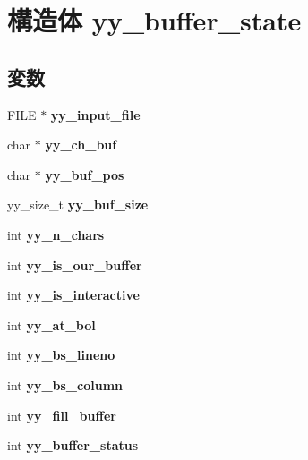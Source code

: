 \section{構造体 yy\_\-buffer\_\-state}
\label{structyy__buffer__state}
\subsection*{変数}
\begin{DoxyCompactItemize}
\item 
FILE $\ast$ {\bfseries yy\_\-input\_\-file}\label{structyy__buffer__state_afb2a40bf9a1b84be81d8e8c0bbcbee21}

\item 
char $\ast$ {\bfseries yy\_\-ch\_\-buf}\label{structyy__buffer__state_af61a9e79f8fc1edb3ae8a2fa2952ce22}

\item 
char $\ast$ {\bfseries yy\_\-buf\_\-pos}\label{structyy__buffer__state_ae8850ab3d90f9339c392020e7d83c4c7}

\item 
yy\_\-size\_\-t {\bfseries yy\_\-buf\_\-size}\label{structyy__buffer__state_a98a79041ff2a95eaa8a5c6d1e1562306}

\item 
int {\bfseries yy\_\-n\_\-chars}\label{structyy__buffer__state_aa86c122f2050dbfd365fcf547e6fc1c3}

\item 
int {\bfseries yy\_\-is\_\-our\_\-buffer}\label{structyy__buffer__state_a1e64bbdc1343d886bee3af97e19644bc}

\item 
int {\bfseries yy\_\-is\_\-interactive}\label{structyy__buffer__state_a2a823a361fbbe1af51a957d0d0cbf4e2}

\item 
int {\bfseries yy\_\-at\_\-bol}\label{structyy__buffer__state_a8e60af6806593faf52d1cc01148af6e3}

\item 
int {\bf yy\_\-bs\_\-lineno}
\item 
int {\bf yy\_\-bs\_\-column}
\item 
int {\bfseries yy\_\-fill\_\-buffer}\label{structyy__buffer__state_a5e492694db97a0d7760d8cc5fd058dfd}

\item 
int {\bfseries yy\_\-buffer\_\-status}\label{structyy__buffer__state_a6ca09e676a787676260c558a0f731285}

\end{DoxyCompactItemize}


